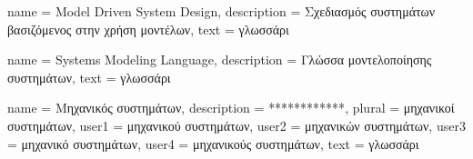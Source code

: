 
	{name			= {Model Driven System Design},
	 description	= {Σχεδιασμός συστημάτων βασιζόμενος στην χρήση μοντέλων},
	 text			= {γλωσσάρι}
	}
	
	{name			= {Systems Modeling Language},
	 description	= {Γλώσσα μοντελοποίησης συστημάτων},
	 text			= {γλωσσάρι}
	}
	
	{name			= {Μηχανικός συστημάτων},
	 description	= {************},
	 plural			= {μηχανικοί συστημάτων},
	 user1			= {μηχανικού συστημάτων},
	 user2			= {μηχανικών συστημάτων},
	 user3			= {μηχανικό συστημάτων},
	 user4			= {μηχανικούς συστημάτων},
	 text			= {γλωσσάρι}
	}